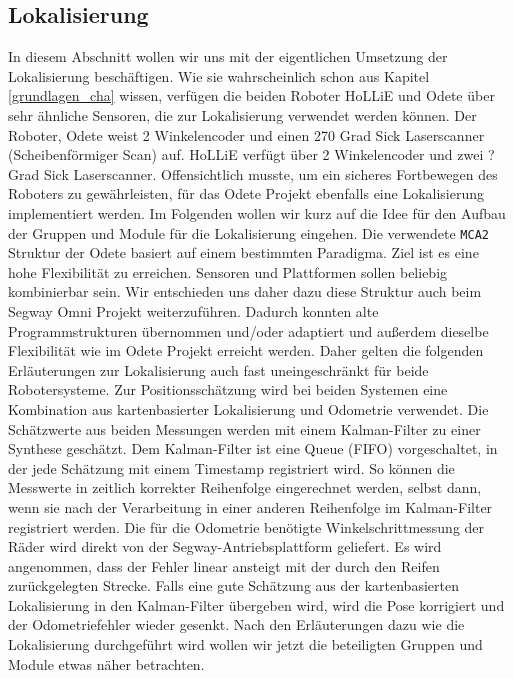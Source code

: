 \subsection{Lokalisierung} 
In diesem Abschnitt wollen wir uns mit der eigentlichen Umsetzung der
 Lokalisierung beschäftigen. Wie sie wahrscheinlich schon aus Kapitel
 \ref{grundlagen_cha} wissen, verfügen die beiden Roboter HoLLiE und
 Odete über sehr ähnliche Sensoren, die zur Lokalisierung verwendet werden
 können. Der Roboter, Odete weist 2 Winkelencoder und einen 270 Grad Sick
 Laserscanner (Scheibenförmiger Scan) auf.
 HoLLiE verfügt über 2 Winkelencoder und zwei
 ? Grad
 Sick Laserscanner.
 Offensichtlich musste, um ein sicheres Fortbewegen des Roboters zu gewährleisten, für das Odete Projekt
 ebenfalls eine Lokalisierung implementiert werden.
 Im Folgenden wollen wir kurz auf die Idee für den Aufbau der Gruppen
 und Module für die Lokalisierung eingehen.
 Die verwendete \lstinline{MCA2} Struktur der Odete basiert auf einem bestimmten
 Paradigma.
 Ziel ist es eine hohe Flexibilität zu erreichen. Sensoren und Plattformen sollen
 beliebig kombinierbar sein. Wir entschieden uns daher dazu diese Struktur auch
 beim Segway Omni Projekt weiterzuführen. Dadurch konnten alte Programmstrukturen
 übernommen und/oder adaptiert und außerdem dieselbe Flexibilität wie im Odete Projekt
 erreicht werden. Daher gelten die folgenden Erläuterungen zur Lokalisierung
 auch fast uneingeschränkt für beide Robotersysteme.
 Zur Positionsschätzung wird bei beiden Systemen eine Kombination aus
 kartenbasierter Lokalisierung und Odometrie verwendet. Die Schätzwerte aus beiden Messungen werden mit einem Kalman-Filter zu einer
 Synthese geschätzt. Dem Kalman-Filter ist eine Queue (FIFO) vorgeschaltet, in der jede Schätzung
 mit einem Timestamp registriert wird. So können die Messwerte in zeitlich korrekter Reihenfolge
 eingerechnet werden, selbst dann, wenn sie nach der Verarbeitung in einer anderen Reihenfolge
 im Kalman-Filter registriert werden. Die für die Odometrie benötigte Winkelschrittmessung der Räder wird direkt
 von der Segway-Antriebsplattform geliefert.
 Es wird angenommen, dass der Fehler linear ansteigt mit der durch den Reifen zurückgelegten Strecke.
 Falls eine gute Schätzung aus der kartenbasierten Lokalisierung in den Kalman-Filter übergeben wird,
 wird die Pose korrigiert und der Odometriefehler wieder gesenkt.
 Nach den Erläuterungen dazu wie die Lokalisierung durchgeführt wird wollen wir
 jetzt die beteiligten Gruppen und Module etwas näher betrachten. 

